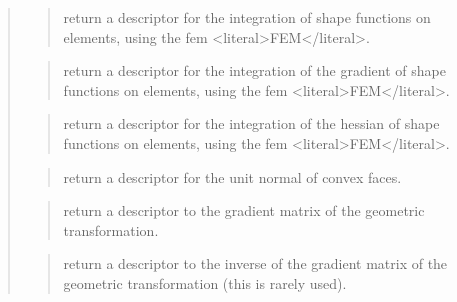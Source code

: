 \documentclass[a4paper,11pt,english]{sphinxmanual}
\begin{document}
\sphinxAtStartPar
{}
\begin{quote}

\sphinxAtStartPar
{}
\begin{quote}

\sphinxAtStartPar
return a descriptor for the integration of shape functions on
elements, using the fem \textless{}literal\textgreater{}FEM\textless{}/literal\textgreater{}.
\end{quote}

\sphinxAtStartPar
{}
\begin{quote}

\sphinxAtStartPar
return a descriptor for the integration of the gradient of shape
functions on elements, using the fem \textless{}literal\textgreater{}FEM\textless{}/literal\textgreater{}.
\end{quote}

\sphinxAtStartPar
{}
\begin{quote}

\sphinxAtStartPar
return a descriptor for the integration of the hessian of shape
functions on elements, using the fem \textless{}literal\textgreater{}FEM\textless{}/literal\textgreater{}.
\end{quote}

\sphinxAtStartPar
{}
\begin{quote}

\sphinxAtStartPar
return a descriptor for the unit normal of convex faces.
\end{quote}

\sphinxAtStartPar
{}
\begin{quote}

\sphinxAtStartPar
return a descriptor to the gradient matrix of the geometric
transformation.
\end{quote}

\sphinxAtStartPar
{}
\begin{quote}

\sphinxAtStartPar
return a descriptor to the inverse of the gradient matrix of the
geometric transformation (this is rarely used).
\end{quote}


\end{quote}
\end{document}
